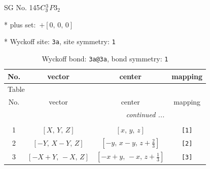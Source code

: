 \documentclass[fleqn,8pt]{jsarticle}
\begin{document}
\setcounter{MaxMatrixCols}{32}

\renewcommand{\tablename}{Table~}
\renewcommand{\figurename}{Figure~}
\begin{center}
\LARGE
SG No. 145\quad$C_{\rm 3}^{3}$\quad$P3_2$\quad[ trigonal ]
\end{center}

* plus set:\,\,\,$+\left[ 0,\, 0,\, 0 \right]$


* Wyckoff site: {\tt 3a}, site symmetry: {\tt 1}
\renewcommand{\arraystretch}{1.2}
\begin{longtable}{cccc}
\caption{Wyckoff bond: {\tt 3a@3a}, bond symmetry: {\tt 1}}
 \\
 \hline \hline
No. & vector & center & mapping \\ \hline \endfirsthead

\multicolumn{3}{l}{\tablename\ \thetable{}} \\
 \hline \hline
No. & vector & center & mapping \\ \hline \endhead

 \hline \hline
\multicolumn{3}{r}{\footnotesize\it continued ...} \\ \endfoot

 \hline \hline
\multicolumn{3}{r}{} \\ \endlastfoot

1 & $\left[ X,\, Y,\, Z \right]$ & $\left[ x,\, y,\, z \right]$ & {\tt [1]} \\ \hline
2 & $\left[ - Y,\, X - Y,\, Z \right]$ & $\left[ - y,\, x - y,\, z + \frac{2}{3} \right]$ & {\tt [2]} \\ \hline
3 & $\left[ - X + Y,\, - X,\, Z \right]$ & $\left[ - x + y,\, - x,\, z + \frac{1}{3} \right]$ & {\tt [3]} \\
\end{longtable}
\end{document}
